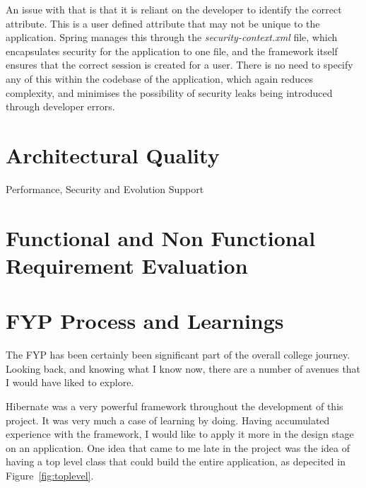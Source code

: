 An issue with that is that it is reliant on the developer to identify the correct attribute. This is a user defined attribute that may not be unique to the application. Spring manages this through the \textit{security-context.xml} file, which encapsulates security for the application to one file, and the framework itself ensures that the correct session is created for a user. There is no need to specify any of this within the codebase of the application, which again reduces complexity, and minimises the possibility of security leaks being introduced through developer errors.

\section{Architectural Quality}



Performance, Security and Evolution Support

\section{Functional and Non Functional Requirement Evaluation}

\section{FYP Process and Learnings}

The FYP has been certainly been significant part of the overall college journey. Looking back, and knowing what I know now, there are a number of avenues that I would have liked to explore.

Hibernate was a very powerful framework throughout the development of this project. It was very much a case of learning by doing. Having accumulated experience with the framework, I would like to apply it more in the design stage on an application. One idea that came to me late in the project was the idea of having a top level class that could build the entire application, as depecited in Figure~\ref{fig:toplevel}.

